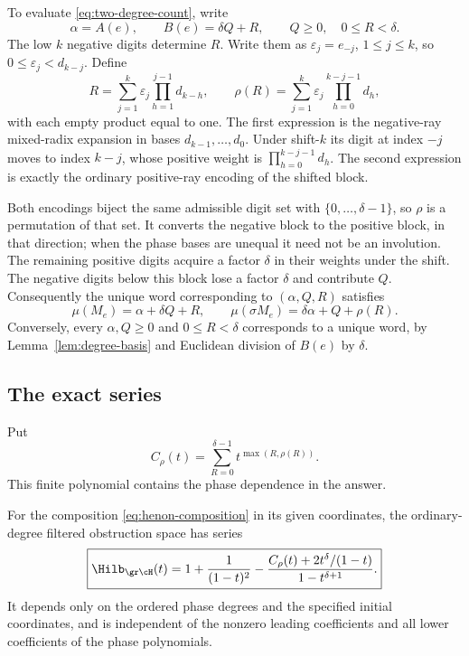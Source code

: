 To evaluate \eqref{eq:two-degree-count}, write
\[
  \alpha=A(e),\qquad B(e)=\delta Q+R,
  \qquad Q\ge0,\quad0\le R<\delta.
\]
The low $k$ negative digits determine $R$.  Write them as
$\varepsilon_j=e_{-j}$, $1\le j\le k$, so
$0\le\varepsilon_j<d_{k-j}$.  Define
\begin{equation}
  R=\sum_{j=1}^k\varepsilon_j
          \prod_{h=1}^{j-1}d_{k-h},\qquad
  \rho(R)=\sum_{j=1}^k\varepsilon_j
          \prod_{h=0}^{k-j-1}d_h,
  \label{eq:rho-reencoding}
\end{equation}
with each empty product equal to one.  The first expression is the
negative-ray mixed-radix expansion in bases
$d_{k-1},\ldots,d_0$.  Under shift-$k$ its digit at index $-j$
moves to index $k-j$, whose positive weight is
$\prod_{h=0}^{k-j-1}d_h$.  The second expression is exactly the
ordinary positive-ray encoding of the shifted block.

Both encodings biject the same admissible digit set with
$\{0,\ldots,\delta-1\}$, so $\rho$ is a permutation of that set.
It converts the negative block to the positive block, in that direction;
when the phase bases are unequal it need not be an involution.
The remaining positive digits acquire a factor $\delta$ in their
weights under the shift.  The negative digits below this block lose
a factor $\delta$ and contribute $Q$.  Consequently the unique word
corresponding to $(\alpha,Q,R)$ satisfies
\begin{equation}
  \mu(M_e)=\alpha+\delta Q+R,\qquad
  \mu(\sigma M_e)=\delta\alpha+Q+\rho(R).
  \label{eq:two-macro-degrees}
\end{equation}
Conversely, every $\alpha,Q\ge0$ and $0\le R<\delta$ corresponds
to a unique word, by Lemma~\ref{lem:degree-basis} and Euclidean
division of $B(e)$ by $\delta$.

\subsection{The exact series}

Put
\begin{equation}
  C_\rho(t)=\sum_{R=0}^{\delta-1}t^{\max(R,\rho(R))}.
  \label{eq:phase-count-polynomial}
\end{equation}
This finite polynomial contains the phase dependence in the answer.

\begin{theorem}
\label{thm:hilbert}
For the composition \eqref{eq:henon-composition} in its given
coordinates, the ordinary-degree filtered obstruction space has series
\begin{equation}
  \boxed{
  \Hilb_{\gr\cH}(t)
    =1+\frac{1}{(1-t)^2}
      -\frac{C_\rho(t)+2t^\delta/(1-t)}{1-t^{\delta+1}}.}
  \label{eq:general-hilbert-series}
\end{equation}
It depends only on the ordered phase degrees and the specified initial
coordinates, and is independent of the nonzero leading coefficients
and all lower coefficients of the phase polynomials.
\end{theorem}


